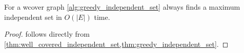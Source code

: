 
\begin{theorem}
  \label{thm:well_covered_maximum_independent_set}
  For a \gls{wcover} graph \cref{alg:greedy_independent_set} always
  finds a maximum independent set in \(O(|E|)\) time.
\end{theorem}

\begin{proof}
   follows directly
  from \cref{thm:well_covered_independent_set,thm:greedy_independent_set}.
\end{proof}


% 


